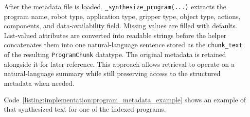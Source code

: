 %
%
%

After the metadata file is loaded, \texttt{\_synthesize\_program(...)} extracts the program name, robot type, application type, gripper type, object type, actions, components, and data-availability field. Missing values are filled with defaults. List-valued attributes are converted into readable strings before the helper concatenates them into one natural-language sentence stored as the \texttt{chunk\_text} of the resulting \texttt{ProgramChunk} datatype. The original metadata is retained alongside it for later reference. This approach allows retrieval to operate on a natural-language summary while still preserving access to the structured metadata when needed.

Code~\ref{listing:implementation:program_metadata_example} shows an example of that synthesized text for one of the indexed programs.

